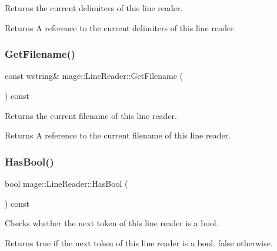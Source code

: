 Returns the current delimiters of this line reader.

\begin{DoxyReturn}{Returns}
A reference to the current delimiters of this line reader. 
\end{DoxyReturn}
\hypertarget{classmage_1_1_line_reader_a682ed8030c99a62d4409a01f9efa6d6b}{}\label{classmage_1_1_line_reader_a682ed8030c99a62d4409a01f9efa6d6b} 
\subsubsection{\texorpdfstring{Get\+Filename()}{GetFilename()}}
{\footnotesize\ttfamily const wstring\& mage\+::\+Line\+Reader\+::\+Get\+Filename (\begin{DoxyParamCaption}{ }\end{DoxyParamCaption}) const\hspace{0.3cm}{\ttfamily [noexcept]}}

Returns the current filename of this line reader.

\begin{DoxyReturn}{Returns}
A reference to the current filename of this line reader. 
\end{DoxyReturn}
\hypertarget{classmage_1_1_line_reader_ac18069cc6bc399ce6ad8ad069a073c6c}{}\label{classmage_1_1_line_reader_ac18069cc6bc399ce6ad8ad069a073c6c} 
\subsubsection{\texorpdfstring{Has\+Bool()}{HasBool()}}
{\footnotesize\ttfamily bool mage\+::\+Line\+Reader\+::\+Has\+Bool (\begin{DoxyParamCaption}{ }\end{DoxyParamCaption}) const\hspace{0.3cm}{\ttfamily [protected]}}

Checks whether the next token of this line reader is a {\ttfamily bool}.

\begin{DoxyReturn}{Returns}
{\ttfamily true} if the next token of this line reader is a {\ttfamily bool}. {\ttfamily false} otherwise. 
\end{DoxyReturn}
\hypertarget{classmage_1_1_line_reader_a7eb54d60902d1fb7846ea5c566312a0f}{}\label{classmage_1_1_line_reader_a7eb54d60902d1fb7846ea5c566312a0f} 
